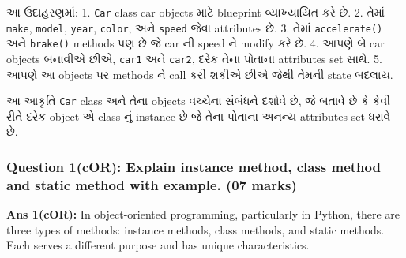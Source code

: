 આ ઉદાહરણમાં: 1. \texttt{Car} class car objects માટે blueprint વ્યાખ્યાયિત કરે
છે. 2. તેમાં \texttt{make}, \texttt{model}, \texttt{year}, \texttt{color},
અને \texttt{speed} જેવા attributes છે. 3. તેમાં \texttt{accelerate()} અને
\texttt{brake()} methods પણ છે જે car ની speed ને modify કરે છે. 4. આપણે બે car
objects બનાવીએ છીએ, \texttt{car1} અને \texttt{car2}, દરેક તેના પોતાના
attributes set સાથે. 5. આપણે આ objects પર methods ને call કરી શકીએ છીએ જેથી
તેમની state બદલાય.

\begin{Shaded}
\begin{Highlighting}[]
\NormalTok{    \}}
    
\NormalTok{    \}}
    
\NormalTok{    \}}
\end{Highlighting}
\end{Shaded}

આ આકૃતિ \texttt{Car} class અને તેના objects વચ્ચેના સંબંધને દર્શાવે છે, જે બતાવે છે કે
કેવી રીતે દરેક object એ class નું instance છે જે તેના પોતાના અનન્ય attributes set
ધરાવે છે.

\hypertarget{question-1cor-explain-instance-method-class-method-and-static-method-with-example.-07-marks}{%
\subsubsection{Question 1(cOR): Explain instance method, class method
and static method with example. (07
marks)}\label{question-1cor-explain-instance-method-class-method-and-static-method-with-example.-07-marks}}

\textbf{Ans 1(cOR):} In object-oriented programming, particularly in
Python, there are three types of methods: instance methods, class
methods, and static methods. Each serves a different purpose and has
unique characteristics.

